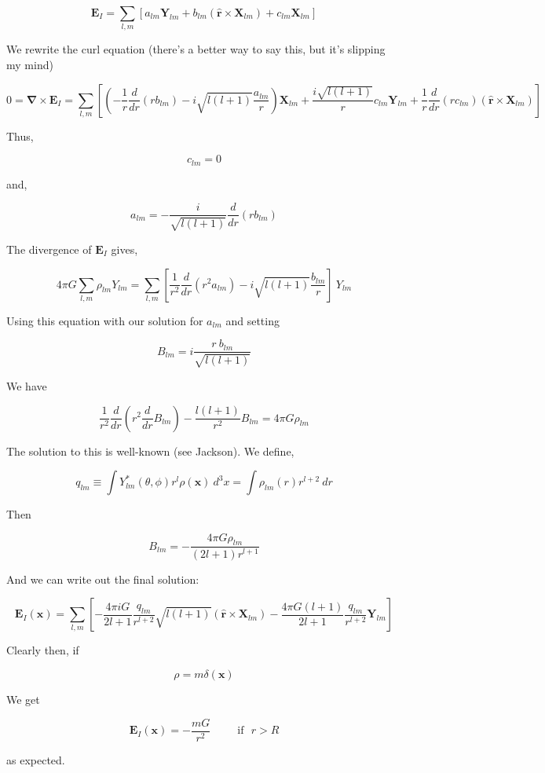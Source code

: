 \documentclass {article}
\renewcommand\vec{\mathbf}
\let\OldS\nabla
\renewcommand{\nabla}{\boldsymbol{\OldS}}
\let\OldHat\hat
\renewcommand{\hat}[1]{\OldHat{\mathbf{#1}}}
\begin{document}
$$\vec E_I =  \sum_{l,m} \left[a_{lm}\vec Y_{lm} +b_{lm} (\hat r \times \vec X_{lm}) +c_{lm}\vec X_{lm} \right] $$

We rewrite the curl equation (there's a better way to say this, but it's slipping my mind)

$$ 0 = \nabla \times \vec E_I  = \sum_{l, m} \left[ \left( - \frac 1 r \frac d {dr} (r b_{lm}) - i \sqrt {l ( l +1)}  \frac {a_{lm} } r \right) \vec X_{lm} + \frac {i \sqrt {l(l+1)} } r c_{lm} \vec Y_{lm} + \frac 1 r \frac d {dr} (r c_{lm}) (\hat r \times \vec X_{lm}) \right] $$

Thus,

$$ c_{lm} = 0 $$

and,

$$a_{lm} = - \frac i {\sqrt{l(l+1)} }\frac d {dr} (r b_{lm}) $$

The divergence of $\vec E_I$ gives,

$$ 4 \pi G \sum_{l, m} \rho_{lm} Y_{lm} = \sum_{l, m} \left[ \frac 1 {r^2} \frac d {dr} (r^2 a_{lm} ) - i \sqrt{l(l+1)} \frac {b_{lm}} r  \right] ~ Y_{lm} $$

Using this equation with our solution for $a_{lm}$ and setting 

$$B_{lm} = i \frac {r ~ b_{lm}} {\sqrt {l (l+1)}} $$

We have

$$\frac 1 {r^2} \frac d {dr} \left( r^2 \frac d {dr} B_{lm} \right) - \frac {l(l+1)} {r^2} B_{lm} = 4 \pi G \rho_{lm}$$

The solution to this is well-known (see Jackson). We define,

$$q_{lm} \equiv \int Y_{lm}^* (\theta, \phi) r^l  \rho (\vec x) ~ d^3x = \int \rho_{lm} (r) r^{l+2} ~ dr $$

Then 

$$ B_{lm} = - \frac {4 \pi G \rho_{lm}} {(2l +1) r^{l+1}} $$ 
 

And we can write out the final solution:

$$\vec E_I(\vec x) = \sum_{l,m} \left[ -\frac {4\pi i G }{2l+1} \frac {q_{lm}}{r^{l+2}} \sqrt {l(l+1)} \left(\hat r \times \vec X_{lm} \right)  - \frac {4 \pi G (l+1)}{2l+1} \frac {q_{lm}}{r^{l+2}} \vec Y_{lm} \right] $$


Clearly then, if

$$\rho = m\delta(\vec x) $$

We get

$$\vec E_I(\vec x) = - \frac {mG} {r^2}  ~~~~~~~~~~~ \textrm{if} ~~~ r > R$$

as expected.
\newpage
\end{document}
